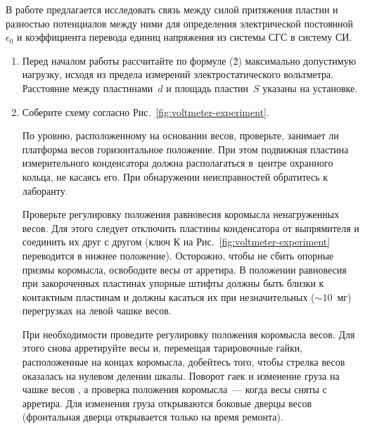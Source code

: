 \begin{lab:task}
	
	В работе предлагается исследовать связь между силой  притяжения пластин и разностью потенциалов между ними для
	определения электрической постоянной $\epsilon_0$ и коэффициента перевода единиц напряжения из системы СГС в систему СИ.
	
	
	\begin{enumerate}
		\item Перед началом работы рассчитайте по формуле (\r{2}) максимально допустимую нагрузку, исходя из предела измерений
		электростатического вольтметра. Расстояние между пластинами~$d$ и площадь пластин~$S$ указаны на установке.
		
		\item Соберите схему согласно Рис.~\ref{fig:voltmeter-experiment}.
		
		По уровню, расположенному на основании весов, проверьте, занимает ли платформа весов горизонтальное положение. При этом
		подвижная пластина измерительного конденсатора должна располагаться в~центре охранного кольца, не касаясь его. При
		обнаружении неисправностей обратитесь к лаборанту.
		
		Проверьте регулировку положения равновесия коромысла ненагруженных весов. Для этого следует отключить пластины
		конденсатора от выпрямителя и соединить их друг с другом (ключ К на Рис.~\ref{fig:voltmeter-experiment} переводится в нижнее положение). Осторожно,
		чтобы не сбить опорные призмы коромысла, освободите весы от арретира. В положении равновесия при закороченных пластинах
		упорные штифты должны быть близки к контактным пластинам и должны касаться их при незначительных ($\sim 10$~мг)
		перегрузках на левой чашке весов.
		
		При необходимости проведите регулировку положения коромысла весов. Для этого снова арретируйте весы и, перемещая
		тарировочные гайки, расположенные на концах коромысла, добейтесь того, чтобы стрелка весов оказалась на нулевом делении
		шкалы. Поворот гаек и изменение груза на чашке весов , а проверка
		положения коромысла~--- когда весы сняты с арретира. Для изменения груза открываются боковые дверцы весов (фронтальная
		дверца открывается только на время ремонта).
		

\end{enumerate}
\end{lab:task}
